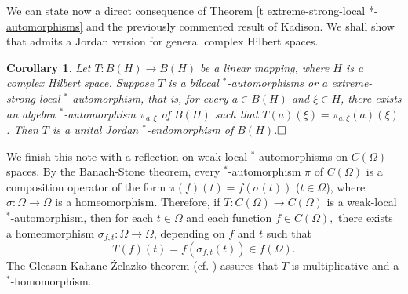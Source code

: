 \documentclass[11pt]{amsart}
\newtheorem{corollary}[theorem]{Corollary}
\begin{document}
We can state now a direct consequence of Theorem \ref{t extreme-strong-local *-automorphisms} and the previously commented result of Kadison. We shall show that \cite[Theorem 1]{Mol2014} admits a Jordan version for general complex Hilbert spaces.

\begin{corollary}\label{c generalization of Molnar bilocal *-automorphisms} Let $T: B(H)\to B(H)$ be a linear mapping, where $H$ is a complex Hilbert space. Suppose $T$ is a bilocal $^*$-automorphisms or a extreme-strong-local $^*$-automorphism, that is, for every $a\in B(H)$ and $\xi \in H$, there exists an algebra $^*$-automorphism $\pi_{a,\xi}$ of $B(H)$ such that $T(a) (\xi) = \pi_{a,\xi} (a) (\xi)$. Then $T$ is a unital Jordan $^*$-endomorphism of $B(H)$.$\hfill\Box$
\end{corollary}

We finish this note with a reflection on weak-local $^*$-automorphisms on $C(\Omega)$-spaces. By the Banach-Stone theorem, every $^*$-automorphism $\pi$ of $C(\Omega)$ is a composition operator of the form $\pi (f) (t) = f(\sigma(t))$ ($t\in \Omega$), where $\sigma: \Omega\to \Omega$ is a homeomorphism. Therefore, if $T: C(\Omega)\to C(\Omega)$ is a weak-local $^*$-automorphism, then for each $t\in \Omega$ and each function $f\in C(\Omega),$ there exists a homeomorphism $\sigma_{f,t}: \Omega\to \Omega$, depending on $f$ and $t$ such that $$T(f) (t) = f(\sigma_{f,t}(t))\in f(\Omega).$$ The Gleason-Kahane-\.{Z}elazko theorem (cf. \cite{Gle,KaZe}) assures that $T$ is multiplicative and a $^*$-homomorphism.
\end{document}
